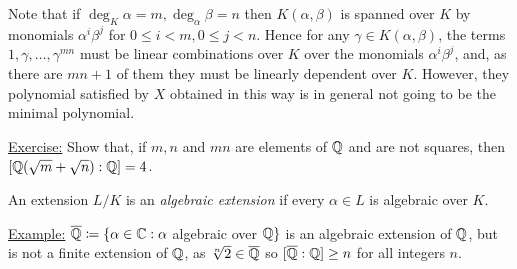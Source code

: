 \documentclass[10pt,a4paper]{article}
\begin{document}
Note that if $\deg_K \alpha = m, \deg_\alpha \beta = n$ then $K(\alpha,\beta)$ is spanned over $K$ by monomials $\alpha^i\beta^j$ for $0\leq i < m, 0\leq j < n$. Hence for any $\gamma \in K(\alpha, \beta)$, the terms $1,\gamma,\ldots,\gamma^{mn}$ must be linear combinations over $K$ over the monomials $\alpha^i \beta^j$, and, as there are $mn+1$ of them they must be linearly dependent over $K$. However, they polynomial satisfied by $X$ obtained in this way is in general not going to be the minimal polynomial.

\underline{Exercise:} Show that, if $m,n$ and $mn$ are elements of $\mathbb{Q}$ and are not squares, then $[\mathbb{Q}(\sqrt{m}+\sqrt{n}):\mathbb{Q}] = 4$.

An extension $L/K$ is an \emph{algebraic extension} if every $\alpha \in L$ is algebraic over $K$.

\underline{Example:} $\overline{\mathbb{Q}} \coloneqq \{\alpha \in \mathbb{C}: \alpha$ algebraic over $\mathbb{Q}\}$ is an algebraic extension of $\mathbb{Q}$, but is not a finite extension of $\mathbb{Q}$, as $\sqrt[n]{2} \in \overline{\mathbb{Q}}$ so $[\overline{\mathbb{Q}}:\mathbb{Q}] \geq n$ for all integers $n$.
\end{document}
